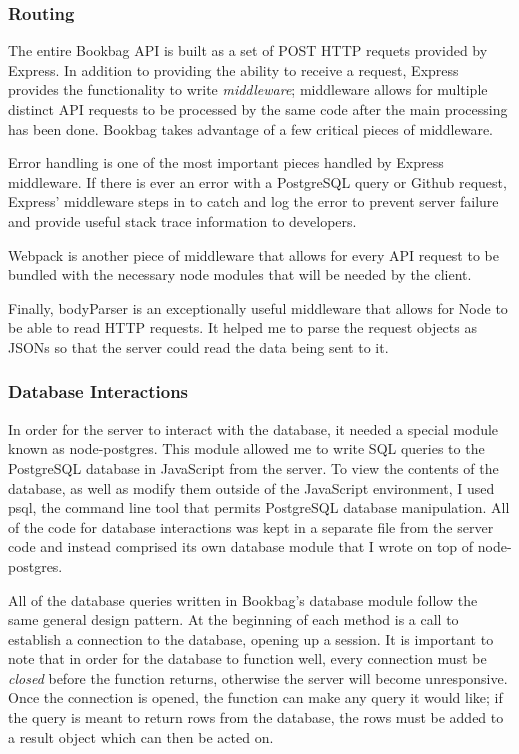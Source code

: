 \documentclass[pageno]{jpaper}
\begin{document}
\subsubsection{Routing}

The entire Bookbag API is built as a set of POST HTTP requets provided by Express. In addition to providing the ability to receive a request, Express provides the functionality to write \textit{middleware}; middleware allows for multiple distinct API requests to be processed by the same code after the main processing has been done. Bookbag takes advantage of a few critical pieces of middleware.

Error handling is one of the most important pieces handled by Express middleware. If there is ever an error with a PostgreSQL query or Github request, Express' middleware steps in to catch and log the error to prevent server failure and provide useful stack trace information to developers.

Webpack is another piece of middleware that allows for every API request to be bundled with the necessary node modules that will be needed by the client.

Finally, bodyParser is an exceptionally useful middleware that allows for Node to be able to read HTTP requests. It helped me to parse the request objects as JSONs so that the server could read the data being sent to it.

\subsubsection{Database Interactions}

In order for the server to interact with the database, it needed a special module known as node-postgres. This module allowed me to write SQL queries to the PostgreSQL database in JavaScript from the server. To view the contents of the database, as well as modify them outside of the JavaScript environment, I used psql, the command line tool that permits PostgreSQL database manipulation. All of the code for database interactions was kept in a separate file from the server code and instead comprised its own database module that I wrote on top of node-postgres.

All of the database queries written in Bookbag's database module follow the  same general design pattern. At the beginning of each method is a call to establish a connection to the database, opening up a session. It is important to note that in order for the database to function well, every connection must be \textit{closed} before the function returns, otherwise the server will become unresponsive. Once the connection is opened, the function can make any query it would like; if the query is meant to return rows from the database, the rows must be added to a result object which can then be acted on. 
\end{document}
